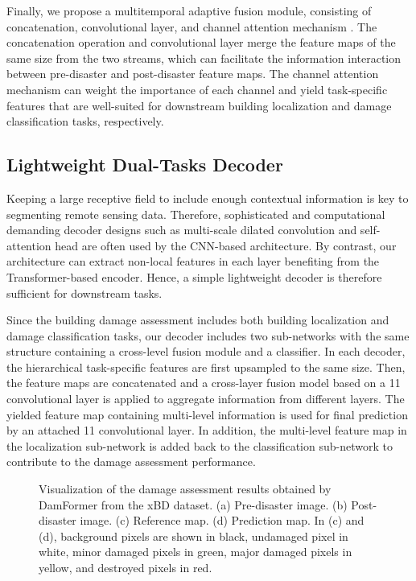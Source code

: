 \documentclass{article}
\begin{document}
\par Finally, we propose a multitemporal adaptive fusion module, consisting of concatenation, convolutional layer, and channel attention mechanism \cite{woo2018cbam}. The concatenation operation and convolutional layer merge the feature maps of the same size from the two streams, which can facilitate the information interaction between pre-disaster and post-disaster feature maps. The channel attention mechanism can weight the importance of each channel and yield task-specific features that are well-suited for downstream building localization and damage classification tasks, respectively.

\subsection{Lightweight Dual-Tasks Decoder}\label{sec:2.2}
\par Keeping a large receptive field to include enough contextual information is key to segmenting remote sensing data. Therefore, sophisticated and computational demanding decoder designs such as multi-scale dilated convolution and self-attention head are often used by the CNN-based architecture. By contrast, our architecture can extract non-local features in each layer benefiting from the Transformer-based encoder. Hence, a simple lightweight decoder is therefore sufficient for downstream tasks.

\par Since the building damage assessment includes both building localization and damage classification tasks, our decoder includes two sub-networks with the same structure containing a cross-level fusion module and a classifier. In each decoder, the hierarchical task-specific features  are first upsampled to the same size. Then, the feature maps are concatenated and a cross-layer fusion model based on 
a 11 convolutional layer is applied to aggregate information from different layers. The yielded feature map containing multi-level information is used for final prediction by an attached 11 convolutional layer. In addition, the multi-level feature map in the localization sub-network is added back to the classification sub-network to contribute to the damage assessment performance. 
\begin{figure}[t]
  \centering
  \hfil
  \hfil
  \hfil
  \caption{Visualization of the damage assessment results obtained by DamFormer from the xBD dataset. (a) Pre-disaster image. (b) Post-disaster image. (c) Reference map. (d) Prediction map. In (c) and (d), background pixels are shown in black, undamaged pixel in white, minor damaged pixels in green, major damaged pixels in yellow, and destroyed pixels in red.}
  \label{fig:2}
\end{figure}
\end{document}
